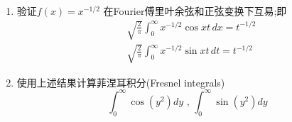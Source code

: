 \documentclass[10pt]{article}
\newenvironment{problem}[2][]{\begin{trivlist}
\item[\hskip \labelsep {\bfseries #1}\hskip \labelsep {\bfseries #2}]}{\end{trivlist}}
\begin{document}
\begin{problem}{6.5}
  \begin{enumerate}
  \item 验证$f(x)=x^{-1 / 2}$ 在Fourier傅里叶余弦和正弦变换下互易;即
  $$
  \begin{aligned}
  & \sqrt{\frac{2}{\pi}} \int_0^{\infty} x^{-1 / 2} \cos {x t} \, dx=t^{-1 / 2} \\
  & \sqrt{\frac{2}{\pi}} \int_0^{\infty} x^{-1 / 2} \sin {x t} \, dt=t^{-1 / 2}
  \end{aligned}
  $$
  \item 使用上述结果计算菲涅耳积分(Fresnel integrals)
  $$
  \int_0^{\infty} \cos \left(y^2\right) d y \text { , } \int_0^{\infty} \sin \left(y^2\right) d y
  $$
\end{enumerate}

\end{problem}
\end{document}
